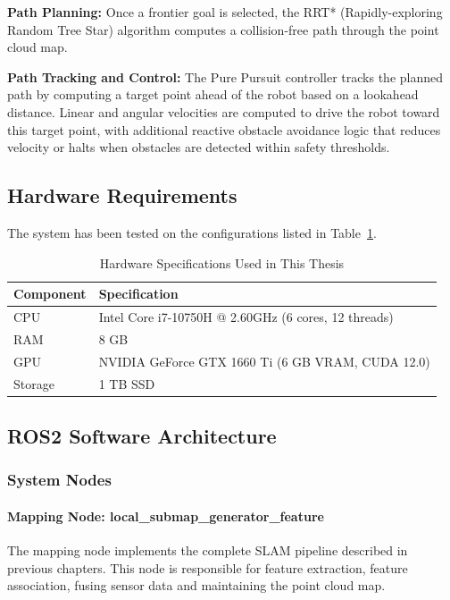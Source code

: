 \documentclass[11pt]{article}
\begin{document}
\textbf{Path Planning:} Once a frontier goal is selected, the RRT* (Rapidly-exploring Random Tree Star) algorithm computes a collision-free path through the point cloud map.

\textbf{Path Tracking and Control:} The Pure Pursuit controller tracks the planned path by computing a target point ahead of the robot based on a lookahead distance. Linear and angular velocities are computed to drive the robot toward this target point, with additional reactive obstacle avoidance logic that reduces velocity or halts when obstacles are detected within safety thresholds.


\subsection{Hardware Requirements}

The system has been tested on the configurations listed in Table~\ref{tab:hardware}.

\begin{table}[h]
	\centering
	\caption{Hardware Specifications Used in This Thesis}
	\label{tab:hardware}
	\begin{tabular}{|l|l|}
		\hline
		\textbf{Component} & \textbf{Specification} \\ \hline
		CPU & Intel Core i7-10750H @ 2.60GHz (6 cores, 12 threads) \\ \hline
		RAM & 8 GB \\ \hline
		GPU & NVIDIA GeForce GTX 1660 Ti (6 GB VRAM, CUDA 12.0) \\ \hline
		Storage & 1 TB SSD \\ \hline
	\end{tabular}
\end{table}



\subsection{ROS2 Software Architecture}

\subsubsection{System Nodes}

\paragraph{Mapping Node: local\_submap\_generator\_feature}


The mapping node implements the complete SLAM pipeline described in previous chapters. This node is responsible for feature extraction, feature association, fusing sensor data and maintaining the point cloud map.
\end{document}
